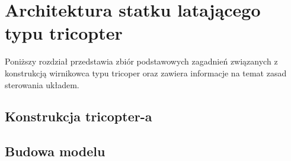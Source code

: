 \chapter{Architektura statku latającego typu tricopter}
\label{cha:architektura_statku_latajacego_typu_tricopter}

Poniższy rozdział przedstawia zbiór podstawowych zagadnień związanych z konstrukcją wirnikowca typu tricoper oraz zawiera informacje na temat zasad sterowania układem.

\section{Konstrukcja tricopter-a}

\section{Budowa modelu}


